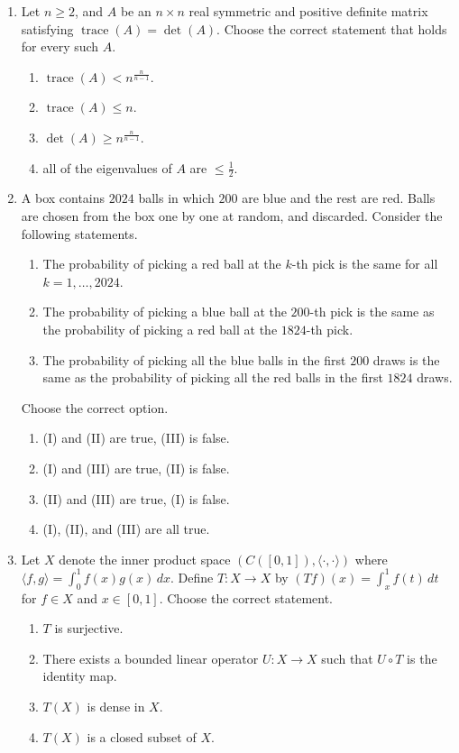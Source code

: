 \documentclass[11pt, a4paper]{article}
\begin{document}
\begin{enumerate}
  \item Let $n \ge 2$, and $A$ be an $n \times n$ real symmetric and positive definite matrix satisfying $\operatorname{trace}(A) = \det(A)$. Choose the correct statement that holds for every such $A$.
  \begin{enumerate}[label=(\alph*)]
    \item $\operatorname{trace}(A) < n^{\frac{n}{n-1}}$.
    \item $\operatorname{trace}(A) \le n$.
    \item $\det(A) \ge n^{\frac{n}{n-1}}$.
    \item all of the eigenvalues of $A$ are $\le \frac{1}{2}$.
  \end{enumerate}

  \item A box contains $2024$ balls in which $200$ are blue and the rest are red. Balls are chosen from the box one by one at random, and discarded. Consider the following statements.
  \begin{enumerate}[label=(\Roman*)]
    \item The probability of picking a red ball at the $k$-th pick is the same for all $k = 1, \dots, 2024$.
    \item The probability of picking a blue ball at the $200$-th pick is the same as the probability of picking a red ball at the $1824$-th pick.
    \item The probability of picking all the blue balls in the first $200$ draws is the same as the probability of picking all the red balls in the first $1824$ draws.
  \end{enumerate}
  Choose the correct option.
  \begin{enumerate}[label=(\alph*)]
    \item (I) and (II) are true, (III) is false.
    \item (I) and (III) are true, (II) is false.
    \item (II) and (III) are true, (I) is false.
    \item (I), (II), and (III) are all true.
  \end{enumerate}

  \item Let $X$ denote the inner product space $(C([0,1]), \langle \cdot, \cdot \rangle)$ where $\langle f, g \rangle = \int_0^1 f(x) g(x)\,dx$. Define $T: X \to X$ by $(Tf)(x) = \int_x^1 f(t)\,dt$ for $f \in X$ and $x \in [0,1]$. Choose the correct statement.
  \begin{enumerate}[label=(\alph*)]
    \item $T$ is surjective.
    \item There exists a bounded linear operator $U: X \to X$ such that $U \circ T$ is the identity map.
    \item $T(X)$ is dense in $X$.
    \item $T(X)$ is a closed subset of $X$.
  \end{enumerate}


\end{enumerate}
\end{document}

